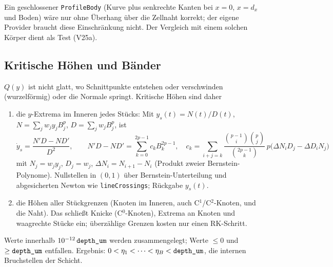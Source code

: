 Ein geschlossener \verb|ProfileBody| (Kurve plus senkrechte Kanten bei $x=0$, $x=d_x$ und Boden) wäre nur ohne Überhang
über die Zellnaht korrekt; der eigene Provider braucht diese Einschränkung nicht. Der Vergleich mit einem solchen
Körper dient als Test (V25a).

\subsection{Kritische Höhen und Bänder}\label{sec:nurbs1d_bands}
$Q(y)$ ist nicht glatt, wo Schnittpunkte entstehen oder verschwinden (wurzelförmig) oder die Normale springt. Kritische
Höhen sind daher
\begin{enumerate}[nosep]
  \item die $y$-Extrema im Inneren jedes Stücks: Mit $y_s(t)=N(t)/D(t)$, $N=\sum_jw_jy_jB^p_j$, $D=\sum_jw_jB^p_j$, ist
        \begin{equation}
          \dot y_s=\frac{N'D-ND'}{D^2},\qquad N'D-ND'=\sum_{k=0}^{2p-1}c_kB^{2p-1}_k,\quad
          c_k=\sum_{i+j=k}\frac{\binom{p-1}{i}\binom{p}{j}}{\binom{2p-1}{k}}\,p\bigl(\Delta N_iD_j-\Delta D_iN_j\bigr)
          \label{eq:nurbs1d_crit}
        \end{equation}
        mit $N_j=w_jy_j$, $D_j=w_j$, $\Delta N_i=N_{i+1}-N_i$ (Produkt zweier Bernstein-Polynome). Nullstellen in
        $(0,1)$ über Bernstein-Unterteilung und abgesicherten Newton wie \verb|lineCrossings|; Rückgabe $y_s(t)$.
  \item die Höhen aller Stückgrenzen (Knoten im Inneren, auch C$^1$/C$^2$-Knoten, und die Naht). Das schließt Knicke
        (C$^0$-Knoten), Extrema an Knoten und waagrechte Stücke ein; überzählige Grenzen kosten nur einen RK-Schritt.
\end{enumerate}
Werte innerhalb $10^{-12}\,\verb|depth_um|$ werden zusammengelegt; Werte $\le0$ und $\ge\verb|depth_um|$ entfallen.
Ergebnis: $0<\eta_1<\dots<\eta_B<\verb|depth_um|$, die internen Bruchstellen der Schicht.
